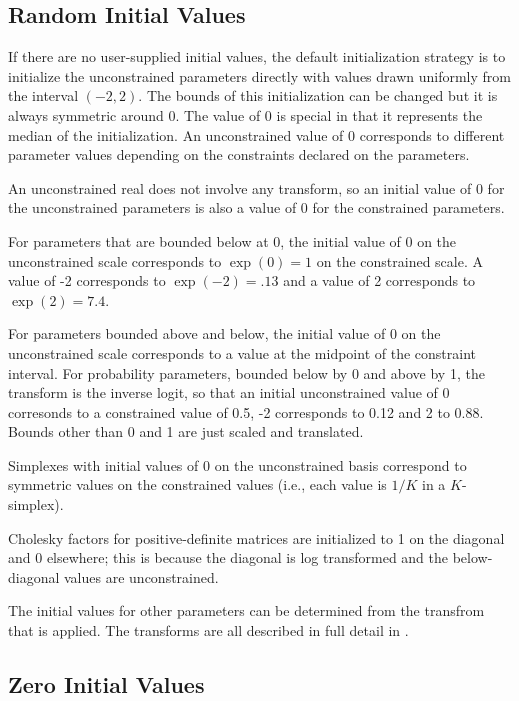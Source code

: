 \subsection{Random Initial Values}

If there are no user-supplied initial values, the default
initialization strategy is to initialize the unconstrained parameters
directly with values drawn uniformly from the interval $(-2,2)$.  The
bounds of this initialization can be changed but it is always
symmetric around 0. The value of 0 is special in that it represents
the median of the initialization.  An unconstrained value of 0
corresponds to different parameter values depending on the constraints
declared on the parameters.

An unconstrained real does not involve any transform, so an initial
value of 0 for the unconstrained parameters is also a value of 0 for
the constrained parameters.  

For parameters that are bounded below at 0, the initial value of 0 on
the unconstrained scale corresponds to $\exp(0) = 1$ on the
constrained scale.  A value of -2 corresponds to $\exp(-2) = .13$ and
a value of 2 corresponds to $\exp(2) = 7.4$.

For parameters bounded above and below, the initial value of 0 on the
unconstrained scale corresponds to a value at the midpoint of the
constraint interval.  For probability parameters, bounded below by 0
and above by 1, the transform is the inverse logit, so that an initial
unconstrained value of 0 corresonds to a constrained value of 0.5, -2
corresponds to 0.12 and 2 to 0.88.  Bounds other than 0 and 1 are
just scaled and translated.

Simplexes with initial values of 0 on the unconstrained basis
correspond to symmetric values on the constrained values (i.e., each
value is $1/K$ in a $K$-simplex).

Cholesky factors for positive-definite matrices are initialized to 1
on the diagonal and 0 elsewhere;  this is because the diagonal is log
transformed and the below-diagonal values are unconstrained.

The initial values for other parameters can be determined from the
transfrom that is applied.  The transforms are all described in full
detail in .

\subsection{Zero Initial Values}

